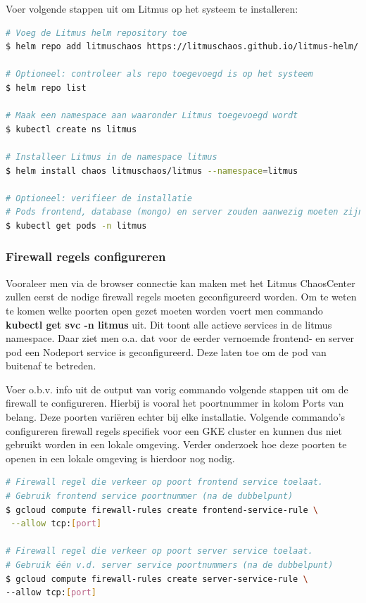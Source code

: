 Voer volgende stappen uit om Litmus op het systeem te installeren:
\begin{lstlisting}[language=bash]
# Voeg de Litmus helm repository toe 
$ helm repo add litmuschaos https://litmuschaos.github.io/litmus-helm/

# Optioneel: controleer als repo toegevoegd is op het systeem
$ helm repo list

# Maak een namespace aan waaronder Litmus toegevoegd wordt
$ kubectl create ns litmus

# Installeer Litmus in de namespace litmus
$ helm install chaos litmuschaos/litmus --namespace=litmus

# Optioneel: verifieer de installatie
# Pods frontend, database (mongo) en server zouden aanwezig moeten zijn.
$ kubectl get pods -n litmus
\end{lstlisting}

\subsubsection{Firewall regels configureren}

Vooraleer men via de browser connectie kan maken met het Litmus ChaosCenter zullen eerst de nodige firewall regels moeten geconfigureerd worden. Om te weten te komen welke poorten open gezet moeten worden voert men commando {\bf kubectl get svc -n litmus} uit. \newline Dit toont alle actieve services in de litmus namespace. Daar ziet men o.a. dat voor de eerder vernoemde frontend- en server pod een Nodeport service is geconfigureerd. Deze laten toe om de pod van buitenaf te betreden. 

Voer o.b.v. info uit de output van vorig commando volgende stappen uit om de firewall te configureren. Hierbij is vooral het poortnummer in kolom Ports van belang. Deze poorten variëren echter bij elke installatie. Volgende commando's configureren firewall regels specifiek voor een GKE cluster en kunnen dus niet gebruikt worden in een lokale omgeving. Verder onderzoek hoe deze poorten te openen in een lokale omgeving is hierdoor nog nodig.  
\begin{lstlisting}[language=bash]
# Firewall regel die verkeer op poort frontend service toelaat.
# Gebruik frontend service poortnummer (na de dubbelpunt) 
$ gcloud compute firewall-rules create frontend-service-rule \
 --allow tcp:[port]

# Firewall regel die verkeer op poort server service toelaat. 
# Gebruik één v.d. server service poortnummers (na de dubbelpunt) 
$ gcloud compute firewall-rules create server-service-rule \
--allow tcp:[port]
\end{lstlisting}

